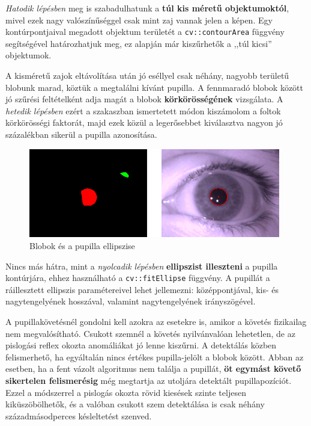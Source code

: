 \emph{Hatodik lépésben} meg is szabadulhatunk a \textbf{túl kis méretű objektumoktól}, mivel ezek nagy valószínűséggel csak mint zaj vannak jelen a képen. Egy kontúrpontjaival megadott objektum területét a \texttt{cv::contourArea} függvény segítségével határozhatjuk meg, ez alapján már kiszűrhetők a ,,túl kicsi'' objektumok.

A kisméretű zajok eltávolítása után jó eséllyel csak néhány, nagyobb területű blobunk marad, köztük a megtalálni kívánt pupilla. A fennmaradó blobok között jó szűrési feltételként adja magát a blobok \textbf{körkörösségének} vizsgálata. A \emph{hetedik lépésben} ezért a  szakaszban ismertetett módon kiszámolom a foltok körkörösségi faktorát, majd ezek közül a legerősebbet kiválasztva nagyon jó százalékban sikerül a pupilla azonosítása.

\begin{figure}[!ht]
\centering
\includegraphics[width=110mm, keepaspectratio]{figures/blob_pupil.png}
\caption{Blobok és a pupilla ellipszise}
\label{fig:blob_pupil}
\end{figure}

Nincs más hátra, mint a \emph{nyolcadik lépésben} \textbf{ellipszist illeszteni} a pupilla kontúrjára, ehhez használható a \texttt{cv::fitEllipse} függvény. A pupillát a ráillesztett ellipszis paramétereivel lehet jellemezni: középpontjával, kis- és nagytengelyének hosszával, valamint nagytengelyének irányszögével.

\bigskip

A pupillakövetésnél gondolni kell azokra az esetekre is, amikor a követés fizikailag nem megvalósítható. Csukott szemnél a követés nyilvánvalóan lehetetlen, de az pislogási reflex okozta anomáliákat jó lenne kiszűrni. A detektálás közben felismerhető, ha egyáltalán nincs értékes pupilla-jelölt a blobok között. Abban az esetben, ha a fent vázolt algoritmus nem találja a pupillát, \textbf{öt egymást követő sikertelen felismerésig} még megtartja az utoljára detektált pupillapozíciót. Ezzel a módszerrel a pislogás okozta rövid kiesések szinte teljesen kiküszöbölhetők, és a valóban csukott szem detektálása is csak néhány századmásodperces késleltetést szenved.

